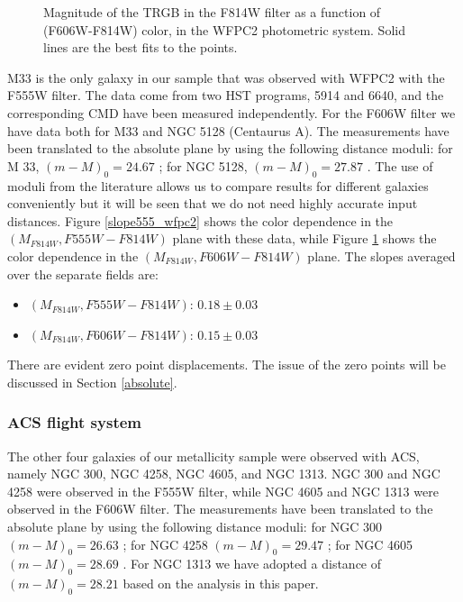 \documentclass[11pt,preprint2]{aastex}
\newcommand{\slopefivewfpc}{$0.18 \pm 0.03$}
\newcommand{\slopesixwfpc}{$0.15 \pm 0.03$}
\begin{document}
\begin{figure}
\caption{Magnitude of the TRGB in the F814W filter as a function of (F606W-F814W) color, in the WFPC2 photometric system. Solid lines are the best fits to the points.\label{slope606_wfpc2}}
\end{figure}

M33 is the only galaxy in our sample that was observed with WFPC2 with the F555W filter. The data come from two HST programs, 5914 and 6640, and the corresponding CMD have been measured independently. For the F606W filter we have data both for M33 and NGC 5128 (Centaurus A). The measurements have been translated to the absolute plane by using the following distance moduli:
for M 33, $(m-M)_0=24.67$ \citep{2006AJ....132.1361S} ; for NGC 5128, $(m-M)_0=27.87$ \citep{2004AA...413..903R}. The use of moduli from the literature allows us to compare results for different galaxies conveniently but it will be seen that we do not need highly accurate input distances. Figure \ref{slope555_wfpc2} shows the color dependence in the $(M_{F814W},F555W-F814W)$ plane with these data, while Figure \ref{slope606_wfpc2} shows the color dependence in the $(M_{F814W},F606W-F814W)$ plane. The slopes averaged over the separate fields are:

\begin{itemize}
\item $(M_{F814W},F555W-F814W)$: \slopefivewfpc
\item $(M_{F814W},F606W-F814W)$: \slopesixwfpc
\end{itemize}
There are evident zero point displacements. The issue of the zero points  will be discussed in Section \ref{absolute}.


\subsubsection{ACS flight system}

The other four galaxies of our metallicity sample were observed with ACS, namely NGC 300, NGC 4258, NGC 4605, and NGC 1313. NGC 300 and NGC 4258 were observed in the F555W filter, while NGC 4605 and NGC 1313 were observed in the F606W filter. The measurements have been translated to the absolute plane by using the following distance moduli: for NGC 300 $(m-M)_0=26.63$ \citep{2004ApJ...608...42S}; for NGC 4258 $(m-M)_0=29.47$ \citep{2001ApJ...553..562N}; for NGC 4605  $(m-M)_0=28.69$ \citep{2006AJ....131.1361K}. For NGC 1313 we have adopted a distance of $(m-M)_0=28.21$ based on the analysis in this paper.
\end{document}
